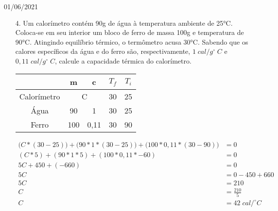 \documentclass{SchoolBook}
\begin{document}
\begin{day}{01/06/2021}
\begin{enumerate}
            \item[4.] Um calorímetro contém 90g de água à temperatura ambiente de 25°C. Coloca-se em seu interior um bloco de ferro de massa 100g e temperatura de 90°C. Atingindo equilíbrio térmico, o termômetro acusa 30°C. Sabendo que os calores específicos da água e do ferro são, respectivamente, $1\;cal/g^\circ\;C$ e $0,11\;cal/g^\circ\;C$, calcule a capacidade térmica do calorímetro.
            \begin{center}
                \vspace{6pt}
                \begin{tabular}{|c|c|c|c|c|}\hline
                                & m   & c    & $T_f$ & $T_i$ \\\hline
                    Calorímetro & \multicolumn{2}{|c|}{C} & 30  & 25    \\\hline
                    Água        & 90  & 1    & 30    & 25    \\\hline
                    Ferro       & 100 & 0,11 & 30    & 90    \\\hline
                \end{tabular}
            \end{center}
            \begin{align*}
                \Big(C * (30 - 25)\Big) +
                \Big(90 * 1 * (30 - 25)\Big) +
                \Big(100 * 0,11 * (30 - 90)\Big) &= 0 \\
                (C * 5) +
                (90 * 1 * 5) +
                (100 * 0,11 * -60) &= 0 \\
                5 C + 450 + (-660) &= 0 \\
                5C &= 0 - 450 + 660 \\
                5C &= 210 \\
                C &= \frac{210}{5} \\
                C &= 42\;cal/^\circ C
            \end{align*}
        \end{enumerate}
    \end{day}
    
\end{document}
